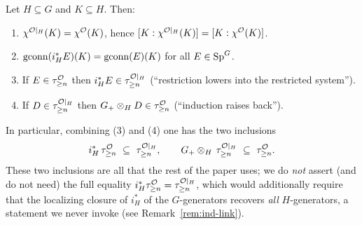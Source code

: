 \begin{qfivelemma}\label{lem:restr}
Let $H\subseteq G$ and $K\subseteq H$. Then:
\begin{enumerate}\setlength\itemsep{2pt}
\item $\chi^{\mathcal{O}|_H}(K)=\chi^{\mathcal{O}}(K)$, hence $[K:\chi^{\mathcal{O}|_H}(K)]=[K:\chi^{\mathcal{O}}(K)]$.
\item $\operatorname{gconn}(i_H^\ast E)(K)=\operatorname{gconn}(E)(K)$ for all $E\in\mathrm{Sp}^G$.
\item If $E\in\tau^{\mathcal{O}}_{\ge n}$ then $i_H^\ast E\in\tau^{\mathcal{O}|_H}_{\ge n}$
(``restriction lowers into the restricted system'').
\item If $D\in\tau^{\mathcal{O}|_H}_{\ge n}$ then $G_+\otimes_H D\in\tau^{\mathcal{O}}_{\ge n}$
(``induction raises back'').
\end{enumerate}
In particular, combining (3) and (4) one has the two inclusions
\[
i_H^\ast\,\tau^\qfiveaO_{\ge n}\ \subseteq\ \tau^{\qfiveaO|_H}_{\ge n},
\qquad
G_+\otimes_H\,\tau^{\qfiveaO|_H}_{\ge n}\ \subseteq\ \tau^\qfiveaO_{\ge n}.
\]
These two inclusions are all that the rest of the paper uses; we do \emph{not}
assert (and do not need) the full equality $i_H^\ast\tau^{\mathcal{O}}_{\ge
n}=\tau^{\mathcal{O}|_H}_{\ge n}$, which would additionally require that the localizing
closure of $i_H^\ast$ of the $G$-generators recovers \emph{all} $H$-generators,
a statement we never invoke (see Remark~\ref{rem:ind-link}).
\end{qfivelemma}

